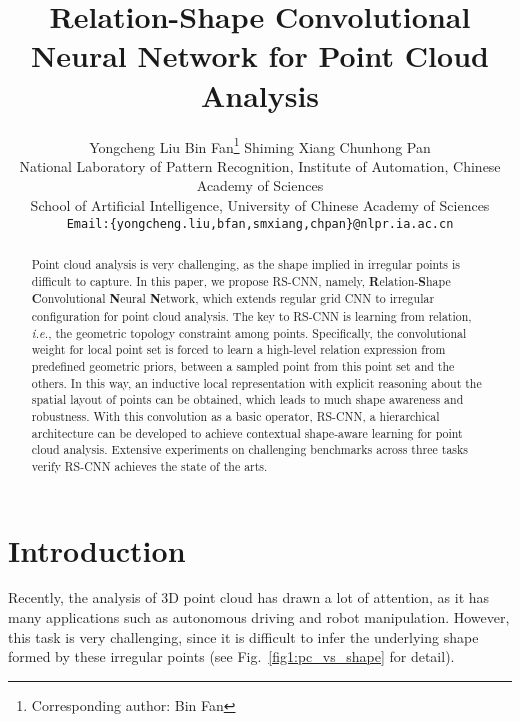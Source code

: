 \documentclass[10pt,twocolumn,letterpaper]{article}
\begin{document}
\title{Relation-Shape Convolutional Neural Network for Point Cloud Analysis}


\author{Yongcheng Liu \quad\quad Bin Fan\thanks{Corresponding author: Bin Fan}\hspace{4pt} \quad\quad Shiming Xiang \quad\quad Chunhong Pan\\
\hspace{1pt}National Laboratory of Pattern Recognition, Institute of Automation, Chinese Academy of Sciences\\
\hspace{1pt}School of Artificial Intelligence, University of Chinese Academy of Sciences\\
{\tt\small Email:\;\{{yongcheng.liu,\;bfan,\;smxiang,\;chpan}\}@nlpr.ia.ac.cn}
}

\maketitle
\thispagestyle{empty}

\begin{abstract}
\label{abstract}
Point cloud analysis is very challenging, as the shape implied in irregular points is difficult to capture.
In this paper, we propose RS-CNN, namely, \textbf{R}elation-\textbf{S}hape \textbf{C}onvolutional \textbf{N}eural \textbf{N}etwork, which extends regular grid CNN to irregular configuration for point cloud analysis.
The key to RS-CNN is learning from relation, \textit{i.e.}, the geometric topology constraint among points.
Specifically, the convolutional weight for local point set is forced to learn a high-level relation expression from predefined geometric priors, between a sampled point from this point set and the others.
In this way, an inductive local representation with explicit reasoning about the spatial layout of points can be obtained, which leads to much shape awareness and robustness.
With this convolution as a basic operator, RS-CNN, a hierarchical architecture can be developed to achieve contextual shape-aware learning for point cloud analysis.
Extensive experiments on challenging benchmarks across three tasks verify RS-CNN achieves the state of the arts.  \end{abstract}

\section{Introduction}
\label{sec:introduction}
Recently, the analysis of 3D point cloud has drawn a lot of attention, as it has many applications such as autonomous driving and robot manipulation.
However, this task is very challenging, since it is difficult to infer the underlying shape formed by these irregular points (see Fig.~\ref{fig1:pc_vs_shape} for detail).
\end{document}
